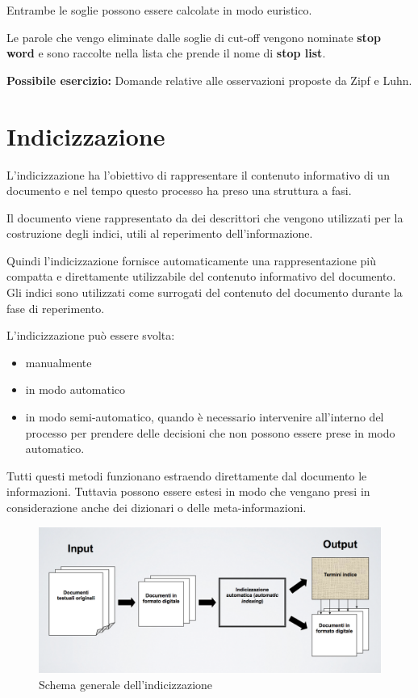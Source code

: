 \noindent Entrambe le soglie possono essere calcolate in modo euristico.

Le parole che vengo eliminate dalle soglie di cut-off vengono nominate \textbf{stop word} e sono raccolte nella lista che prende il nome di \textbf{stop list}.


\textbf{{\color{Red} Possibile esercizio:}} Domande relative alle osservazioni proposte da Zipf e Luhn.

\section{Indicizzazione}

L'indicizzazione ha l'obiettivo di rappresentare il contenuto informativo di un documento e nel tempo questo processo ha preso una struttura a fasi.

Il documento viene rappresentato da dei descrittori che vengono utilizzati per la costruzione degli indici, utili al reperimento dell'informazione.

Quindi l'indicizzazione fornisce automaticamente una rappresentazione più compatta e direttamente utilizzabile del contenuto informativo del documento. Gli indici sono utilizzati come surrogati del contenuto del documento durante la fase di reperimento.

L'indicizzazione può essere svolta:
\begin{itemize}
	\item manualmente
	\item in modo automatico
	\item in modo semi-automatico, quando è necessario intervenire all'interno del processo per prendere delle decisioni che non possono essere prese in modo automatico.
\end{itemize}

\noindent Tutti questi metodi funzionano estraendo direttamente dal documento le informazioni. Tuttavia possono essere estesi in modo che vengano presi in considerazione anche dei dizionari o delle meta-informazioni.

\begin{figure}[htbp]
	\centering
	\includegraphics[width=0.7\linewidth]{images/l3-indicizzazione}
	\caption{Schema generale dell'indicizzazione}
\end{figure}

